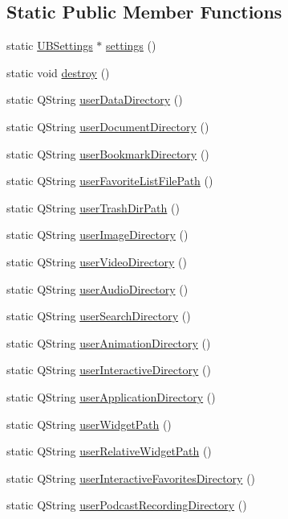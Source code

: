 \subsection*{Static Public Member Functions}
\begin{DoxyCompactItemize}
\item 
static \hyperlink{class_u_b_settings}{U\-B\-Settings} $\ast$ \hyperlink{class_u_b_settings_a0d8ed418921c2b2d37851faeae00715d}{settings} ()
\item 
static void \hyperlink{class_u_b_settings_aef12631aa822bcd9e335e1fadf7174c7}{destroy} ()
\item 
static Q\-String \hyperlink{class_u_b_settings_af38d2ad231149df734ca7b5486356500}{user\-Data\-Directory} ()
\item 
static Q\-String \hyperlink{class_u_b_settings_a821fa5f3b3466be6f47c50adb6142c5a}{user\-Document\-Directory} ()
\item 
static Q\-String \hyperlink{class_u_b_settings_af17820e0cb77d7af1056460420e939b2}{user\-Bookmark\-Directory} ()
\item 
static Q\-String \hyperlink{class_u_b_settings_a41388551025b200d139c0e1433f36f4d}{user\-Favorite\-List\-File\-Path} ()
\item 
static Q\-String \hyperlink{class_u_b_settings_af54a70fe0dfe8eafc63364f5ce085590}{user\-Trash\-Dir\-Path} ()
\item 
static Q\-String \hyperlink{class_u_b_settings_a06c8effdad5e1fe8f3f055017cb00a65}{user\-Image\-Directory} ()
\item 
static Q\-String \hyperlink{class_u_b_settings_a276b64bd659e701341d496c92a41923f}{user\-Video\-Directory} ()
\item 
static Q\-String \hyperlink{class_u_b_settings_ad5bd2cb162fce166059e8016d4537a16}{user\-Audio\-Directory} ()
\item 
static Q\-String \hyperlink{class_u_b_settings_a916a34db93e426e7a3a3274897cf6aa5}{user\-Search\-Directory} ()
\item 
static Q\-String \hyperlink{class_u_b_settings_a71c048d3d3c4a9285a8308b830baef89}{user\-Animation\-Directory} ()
\item 
static Q\-String \hyperlink{class_u_b_settings_ada0e16c52c194af83a8e6510a3b74c76}{user\-Interactive\-Directory} ()
\item 
static Q\-String \hyperlink{class_u_b_settings_a8a5513cd12a30743f213130a53225a7e}{user\-Application\-Directory} ()
\item 
static Q\-String \hyperlink{class_u_b_settings_a6c3967de3dd30645b64cb0d28dbe3336}{user\-Widget\-Path} ()
\item 
static Q\-String \hyperlink{class_u_b_settings_a57d6f29c76bbeead514da60c99cc6b71}{user\-Relative\-Widget\-Path} ()
\item 
static Q\-String \hyperlink{class_u_b_settings_a0eba938d6bd131e9fb3322d999f65cda}{user\-Interactive\-Favorites\-Directory} ()
\item 
static Q\-String \hyperlink{class_u_b_settings_af2f4fde8873c54ae1528b00b3f2e6486}{user\-Podcast\-Recording\-Directory} ()
\end{DoxyCompactItemize}
